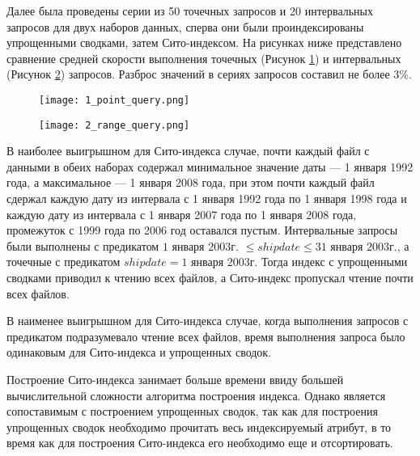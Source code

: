 Далее была проведены серии из 50 точечных запросов и 20 интервальных запросов для двух наборов данных, сперва они были проиндексированы упрощенными сводками, затем Сито-индексом. На рисунках ниже представлено сравнение средней скорости выполнения точечных (Рисунок \ref{figure:point_query}) и интервальных (Рисунок \ref{figure:range_query}) запросов. Разброс значений в сериях запросов составил не более 3\%.

\begin{figure}[h]
    \centering
    \texttt{[image: 1\_point\_query.png]}
    \caption{}
    \label{figure:point_query}
\end{figure}


\begin{figure}[h]
    \centering
    \texttt{[image: 2\_range\_query.png]}
    \caption{}
    \label{figure:range_query}
\end{figure}

В наиболее выигрышном для Сито-индекса случае, почти каждый файл с данными в обеих наборах содержал минимальное значение даты --- 1 января 1992 года, а максимальное --- 1 января 2008 года, при этом почти каждый файл сдержал каждую дату из интервала с 1 января 1992 года по 1 января 1998 года и каждую дату из интервала с 1 января 2007 года по 1 января 2008 года, промежуток с 1999 года по 2006 год оставался пустым. Интервальные запросы были выполнены с предикатом $1$ января $2003$г. $\leq shipdate \leq 31$ января $2003$г., а точечные с предикатом $shipdate = 1$ января $2003$г. Тогда индекс с упрощенными сводками приводил к чтению всех файлов, а Сито-индекс пропускал чтение почти всех файлов.

В наименее выигрышном для Сито-индекса случае, когда выполнения запросов с предикатом подразумевало чтение всех файлов, время выполнения запроса было одинаковым для Сито-индекса и упрощенных сводок.

Построение Сито-индекса занимает больше времени ввиду большей вычислительной сложности алгоритма построения индекса. Однако является сопоставимым с построением упрощенных сводок, так как для построения упрощенных сводок необходимо прочитать весь индексируемый атрибут, в то время как для построения Сито-индекса его необходимо еще и отсортировать.

